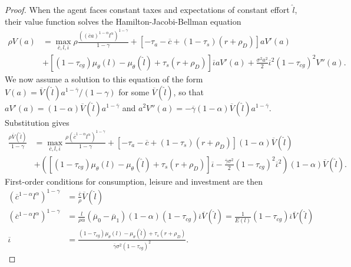 \documentclass[11pt]{article}
\theoremstyle{plain}
\begin{document}
\begin{proof} %
When the agent faces constant taxes and expectations of constant effort $\hat{l}$, their value function solves the Hamilton-Jacobi-Bellman equation
\begin{equation}
\begin{aligned}
\rho V(a) & = \max_{\overline{c},l,\overline{\iota}}\rho \frac{((\overline{c}a)^{1-\alpha}l^{\alpha})^{1-\gamma}}{1-\gamma} + [- \tau_a - \overline{c} + (1-\tau_s)(r + \rho_D)]aV'(a) 
\\ & +  {\left[(1 - \tau_{cg})\mu_{\theta}(l) - \mu_{\theta}(\hat{l}) + \tau_s(r + \rho_D)\right]}\overline{\iota} aV'(a) + \frac{\sigma^2a^2}{2}\overline{\iota}^2(1-\tau_{cg})^2V''(a).
\end{aligned}
\label{agentTAX4}
\end{equation} 
We now assume a solution to this equation of the form $V(a) = \overline{V}(\hat{l})a^{1-\overline{\gamma}}/(1-\gamma)$ for some $\overline{V}(\hat{l})$, so that $aV'(a) = (1-\alpha)\overline{V}(\hat{l})a^{1-\overline{\gamma}}$ and $a^2V''(a) = -\overline{\gamma}(1-\alpha)\overline{V}(\hat{l})a^{1-\overline{\gamma}}$. Substitution gives 
\begin{equation}
\begin{aligned}
\frac{\rho \overline{V}(\hat{l})}{1-\gamma} & = \max_{\overline{c},l,\overline{\iota}} \frac{\rho(\overline{c}^{1-\alpha}l^{\alpha})^{1-\gamma}}{1-\gamma} + [ - \tau_a - \overline{c} + (1-\tau_s)(r + \rho_D)](1-\alpha)\overline{V}(\hat{l})
\\ & +  {\left({\left[(1 - \tau_{cg})\mu_{\theta}(l) - \mu_{\theta}(\hat{l}) + \tau_s(r + \rho_D)\right]}\overline{\iota} - \frac{\overline{\gamma}\sigma^2}{2}(1-\tau_{cg})^2\overline{\iota}^2\right)}(1-\alpha)\overline{V}(\hat{l}).
\end{aligned}
\label{HJBVsimp}
\end{equation}
First-order conditions for consumption, leisure and investment are then 
\begin{align*}
(\overline{c}^{1-\alpha}l^{\alpha})^{1-\gamma} & = \frac{\overline{c}}{\rho}\overline{V}(\hat{l})
\\ (\overline{c}^{1-\alpha}l^{\alpha})^{1-\gamma} & = \frac{l}{\rho\alpha}(\overline{\mu}_0-\overline{\mu}_1) (1-\alpha)(1-\tau_{cg}) \overline{\iota} \overline{V}(\hat{l}) = \frac{1}{E(l)}(1-\tau_{cg})\overline{\iota}\overline{V}(\hat{l})
\\ \overline{\iota} & = \frac{(1 - \tau_{cg})\mu_{\theta}(l) - \mu_{\theta}(\hat{l}) + \tau_s(r + \rho_D)}{\overline{\gamma}\sigma^2(1-\tau_{cg})^2}.

\end{align*}
\end{proof}
\end{document}
